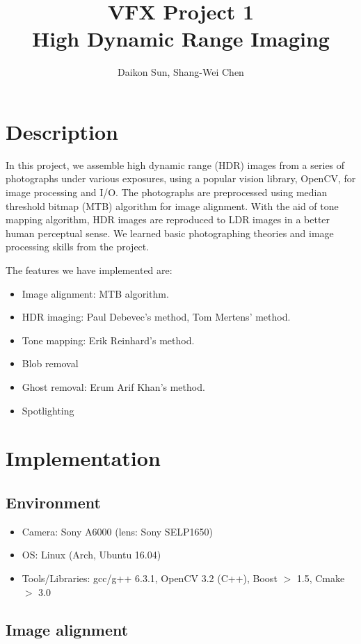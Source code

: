 \documentclass[11pt]{article}
\title{\bf{VFX Project 1\\\large{High Dynamic Range Imaging}}\vspace{-10pt}}
\author{Daikon Sun, Shang-Wei Chen}
\date{}
\begin{document}
\maketitle
\section{Description}
In this project, we assemble high dynamic range (HDR) images from a series of photographs under various exposures, using a popular vision library, OpenCV, for image processing and I/O. The photographs are preprocessed using median threshold bitmap (MTB) algorithm for image alignment. With the aid of tone mapping algorithm, HDR images are reproduced to LDR images in a better human perceptual sense. We learned basic photographing theories and image processing skills from the project. 

The features we have implemented are:
\vspace{-8pt}
\begin{itemize}
  \itemsep=-2pt
  \item Image alignment: MTB algorithm.
  \item HDR imaging: Paul Debevec's method, Tom Mertens' method.
  \item Tone mapping: Erik Reinhard's method.
  \item Blob removal
  \item Ghost removal: Erum Arif Khan's method.
  \item Spotlighting
\end{itemize}
\vspace{-8pt}

\section{Implementation}
\subsection{Environment}
\begin{itemize}
  \itemsep=-2pt
  \item Camera: Sony A6000 (lens: Sony SELP1650)
  \item OS: Linux (Arch, Ubuntu 16.04)
  \item Tools/Libraries: gcc/g++ 6.3.1, OpenCV 3.2 (C++), Boost $>$ 1.5, Cmake $>$ 3.0
\end{itemize}

\subsection{Image alignment}

\end{document}
